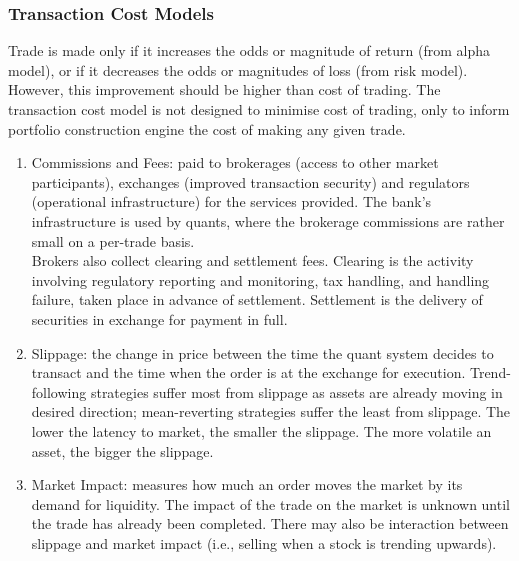 \subsubsection{Transaction Cost Models}

Trade is made only if it increases the odds or magnitude of return (from alpha model), or if it decreases the odds or magnitudes of loss (from risk model). However, this improvement should be higher than cost of trading. The transaction cost model is not designed to minimise cost of trading, only to inform portfolio construction engine the cost of making any given trade.

\begin{remark} 
\begin{enumerate}[label=\roman*.]
\setlength{\itemsep}{0pt}
\item Commissions and Fees: paid to brokerages (access to other market participants), exchanges (improved transaction security) and regulators (operational infrastructure) for the services provided. The bank's infrastructure is used by quants, where the brokerage commissions are rather small on a per-trade basis.\\
Brokers also collect clearing and settlement fees. Clearing is the activity involving regulatory reporting and monitoring, tax handling, and handling failure, taken place in advance of settlement. Settlement is the delivery of securities in exchange for payment in full.
\item Slippage: the change in price between the time the quant system decides to transact and the time when the order is at the exchange for execution. Trend-following strategies suffer most from slippage as assets are already moving in desired direction; mean-reverting strategies suffer the least from slippage. The lower the latency to market, the smaller the slippage. The more volatile an asset, the bigger the slippage.
\item Market Impact: measures how much an order moves the market by its demand for liquidity. The impact of the trade on the market is unknown until the trade has already been completed. There may also be interaction between slippage and market impact (i.e., selling when a stock is trending upwards).
\end{enumerate}
\end{remark}

